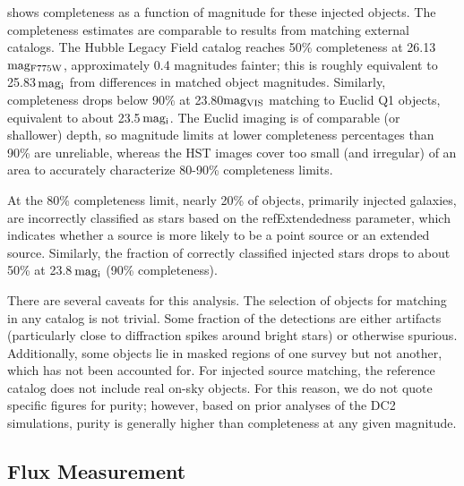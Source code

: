  shows completeness as a function of magnitude for these injected objects. The completeness estimates are comparable to results from matching external catalogs. The Hubble Legacy Field catalog \citep{2019ApJS..244...16W,2016arXiv160600841I} reaches 50\% completeness at 26.13\,${\rm mag_{F775W}}$, approximately 0.4 magnitudes fainter; this is roughly equivalent to 25.83\,${\rm mag_{i}}$ from differences in matched object magnitudes. Similarly, completeness drops below 90\% at 23.80${\rm mag_{VIS}}$ matching to Euclid Q1 \citep{2025arXiv250315305E} objects, equivalent to about 23.5\,${\rm mag_{i}}$. The Euclid imaging is of comparable (or shallower) depth, so magnitude limits at lower completeness percentages than 90\% are unreliable, whereas the HST images cover too small (and irregular) of an area to accurately characterize 80-90\% completeness limits.

At the 80\% completeness limit, nearly 20\% of objects, primarily injected galaxies, are incorrectly classified as stars based on the refExtendedness parameter, which indicates whether a source is more likely to be a point source or an extended source.
Similarly, the fraction of correctly classified injected stars drops to about 50\% at 23.8\,${\rm mag_{i}}$ (90\% completeness).

There are several caveats for this analysis. The selection of objects for matching in any catalog is not trivial. Some fraction of the detections are either artifacts (particularly close to diffraction spikes around bright stars) or otherwise spurious. Additionally, some objects lie in masked regions of one survey but not another, which has not been accounted for. For injected source matching, the reference catalog does not include real on-sky objects. For this reason, we do not quote specific figures for purity; however, based on prior analyses of the DC2 simulations, purity is generally higher than completeness at any given magnitude.

\subsection{Flux Measurement}
\label{ssec:fluxes}

